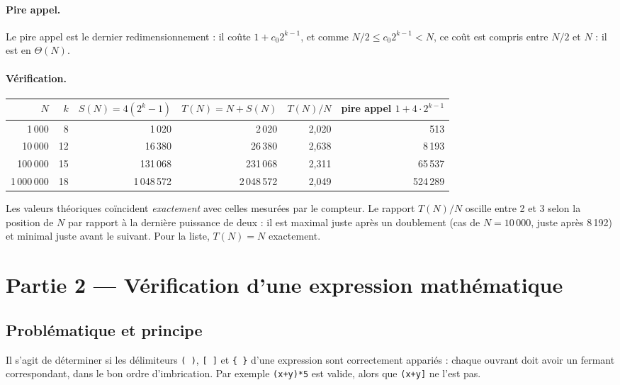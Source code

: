 \documentclass[11pt,a4paper]{article}
\begin{document}
\paragraph{Pire appel.} Le pire appel est le dernier redimensionnement : il coûte $1+c_0 2^{k-1}$, et comme $N/2\le c_0 2^{k-1}<N$, ce coût est compris entre $N/2$ et $N$ : il est en $\Theta(N)$.

\paragraph{Vérification.}

\begin{center}
\renewcommand{\arraystretch}{1.2}
\begin{tabular}{@{}rrrrrr@{}}
\toprule
$N$ & $k$ & $S(N)=4(2^k-1)$ & $T(N)=N+S(N)$ & $T(N)/N$ & pire appel $1+4\cdot 2^{k-1}$ \\
\midrule
1\,000      & 8  & 1\,020     & 2\,020      & 2,020 & 513 \\
10\,000     & 12 & 16\,380    & 26\,380     & 2,638 & 8\,193 \\
100\,000    & 15 & 131\,068   & 231\,068    & 2,311 & 65\,537 \\
1\,000\,000 & 18 & 1\,048\,572 & 2\,048\,572 & 2,049 & 524\,289 \\
\bottomrule
\end{tabular}
\end{center}

Les valeurs théoriques coïncident \emph{exactement} avec celles mesurées par le compteur. Le rapport $T(N)/N$ oscille entre 2 et 3 selon la position de $N$ par rapport à la dernière puissance de deux : il est maximal juste après un doublement (cas de $N=10\,000$, juste après 8\,192) et minimal juste avant le suivant. Pour la liste, $T(N)=N$ exactement.

\section{Partie 2 --- Vérification d'une expression mathématique}

\subsection{Problématique et principe}

Il s'agit de déterminer si les délimiteurs \texttt{( )}, \texttt{[ ]} et \texttt{\{ \}} d'une expression sont correctement appariés : chaque ouvrant doit avoir un fermant correspondant, dans le bon ordre d'imbrication. Par exemple \texttt{(x+y)*5} est valide, alors que \texttt{(x+y]} ne l'est pas.
\end{document}
